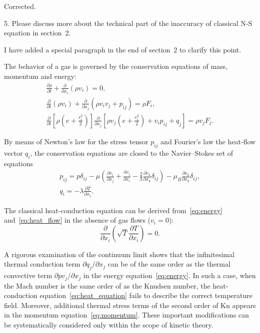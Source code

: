\documentclass{article}
\newcommand{\Kn}{\mathrm{Kn}}
\newcommand{\pder}[2][]{\frac{\partial#1}{\partial#2}}
\newcommand{\Pder}[2][]{\partial#1/\partial#2}
\def\asterism{\par\vspace{1em}{\centering\scalebox{1}{\bfseries *~*~*}\par}\vspace{.5em}\par}
\begin{document}
Corrected.

\begin{quoting}
5. Please discuss more about the technical part of the inaccuracy of
classical N-S equation in section~2.
\end{quoting}

I have added a special paragraph in the end of section~2 to clarify this point.

\begin{leftbar}
The behavior of a gas is governed by the conservation equations of mass, momentum and energy:
\begin{gather}
    \pder[\rho]{t} + \pder{x_i}(\rho v_i) = 0, \label{eq:mass}\\
    \pder{t}(\rho v_i) + \pder{x_j}(\rho v_i v_j + p_{ij}) = \rho F_i, \label{eq:momentum}\\
    \pder{t}\left[\rho\left(e+\frac{v_i^2}2\right)\right]
        \pder{x_j}\left[\rho v_j\left(e+\frac{v_i^2}2\right)+v_i p_{ij}+q_j\right] = \rho v_j F_j. \label{eq:energy}
\end{gather}

\asterism

By means of Newton's law for the stress tensor \(p_{ij}\) and Fourier's law the heat-flow vector \(q_i\),
the conservation equations are closed to the Navier--Stokes set of equations
\begin{gather}
    p_{ij} = p\delta_{ij} - \mu\left(\pder[v_i]{x_j}+\pder[v_j]{x_i}-\frac23\pder[v_k]{x_k}\delta_{ij}\right) -
        \mu_B\pder[v_k]{x_k}\delta_{ij}, \label{eq:stress_tensor}\\
    q_i = -\lambda\pder[T]{x_i}. \label{eq:heat_flow}
\end{gather}

\asterism

The classical heat-conduction equation
can be derived from~\eqref{eq:energy} and~\eqref{eq:heat_flow}
in the absence of gas flows (\(v_i = 0\)):
\begin{equation}\label{eq:heat_equation}
    \pder{x_i}\left(\sqrt{T}\pder[T]{x_i}\right) = 0.
\end{equation}

\asterism

A rigorous examination of the continuum limit shows that the
infinitesimal thermal conduction term \(\Pder[q_j]{x_j}\) can be of the
same order as the thermal convective term \(\Pder[pv_j]{x_j}\) in the
energy equation~\eqref{eq:energy}. In such a case, when the Mach number
is the same order of as the Knudsen number, the heat-conduction
equation~\eqref{eq:heat_equation} fails to describe the correct
temperature field. Moreover, additional thermal stress terms of the
second order of \(\Kn\) appears in the momentum
equation~\eqref{eq:momentum}. These important modifications can be
systematically considered only within the scope of kinetic theory.
\end{leftbar}
\end{document}
